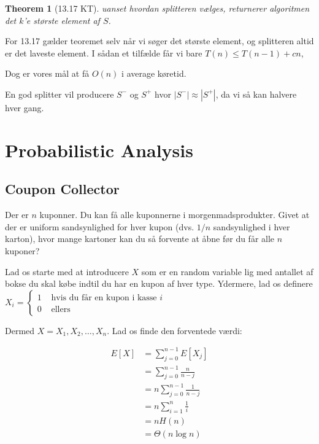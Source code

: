 \documentclass[11pt]{article}
\newtheorem{theorem}{Theorem}
\theoremstyle{definition}
\theoremstyle{remark}
\begin{document}
\begin{theorem}[13.17 KT]
uanset hvordan splitteren vælges, returnerer algoritmen det $k$'e største element af  $S$.
\end{theorem}

For 13.17 gælder teoremet selv når vi søger det største element, og splitteren altid er det laveste element. I sådan et tilfælde får vi bare $T(n) \leq T(n-1)+cn$, 

Dog er vores mål at få $O(n)$ i average køretid. 


En god splitter vil producere $S^{-}$ og $S^{+}$ hvor $|S^{-}| \approx |S^{+}|$, da vi så kan halvere hver gang. 

\newpage

\section{Probabilistic Analysis}
\label{sec:proban}

\subsection{Coupon Collector}

Der er $n$ kuponner. Du kan få alle kuponnerne i morgenmadsprodukter. Givet at der er uniform sandsynlighed for hver kupon (dvs. $1/n$ sandsynlighed i hver karton), hvor mange kartoner kan du så forvente at åbne før du får alle $n$ kuponer?

Lad os starte med at introducere $X$ som er en random variable lig med antallet af bokse du skal købe indtil du har en kupon af hver type. Ydermere, lad os definere $X_{i} = \begin{cases}
  1 & \text{ hvis du får en kupon i kasse }i\\
  0 & \text{ ellers}
\end{cases}$

Dermed $X = X_{1}, X_{2}, \ldots, X_{n}$. Lad os finde den forventede værdi:

\begin{equation}
\begin{split}
  E[X] &= \sum_{j=0}^{n-1}E[X_{j}]\\
       &= \sum_{j=0}^{n-1} \frac{n}{n-j}\\
       &= n \sum_{j=0}^{n-1} \frac{1}{n-j} \\
       &= n \sum_{i=1}^{n} \frac{1}{i} \\
       &= nH(n) \\
  &= \Theta(n \log n)
\end{split}
\end{equation}
\end{document}
